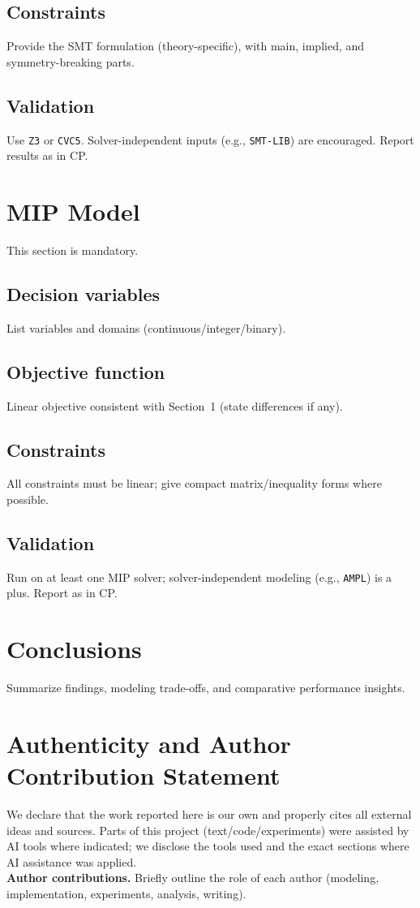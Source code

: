 \documentclass{article}
\begin{document}
\subsection{Constraints}
Provide the SMT formulation (theory-specific), with main, implied, and symmetry-breaking parts.

\subsection{Validation}
Use \texttt{Z3} or \texttt{CVC5}. Solver-independent inputs (e.g., \texttt{SMT-LIB}) are encouraged.
Report results as in CP.

\section{MIP Model}
This section is mandatory.

\subsection{Decision variables}
List variables and domains (continuous/integer/binary).

\subsection{Objective function}
Linear objective consistent with Section~1 (state differences if any).

\subsection{Constraints}
All constraints must be linear; give compact matrix/inequality forms where possible.

\subsection{Validation}
Run on at least one MIP solver; solver-independent modeling (e.g., \texttt{AMPL}) is a plus.
Report as in CP.

\section{Conclusions}
Summarize findings, modeling trade-offs, and comparative performance insights.

\section*{Authenticity and Author Contribution Statement}
We declare that the work reported here is our own and properly cites all external ideas and sources.
Parts of this project (text/code/experiments) were assisted by AI tools where indicated; we disclose the tools used and the exact sections where AI assistance was applied.
\\[0.5em]
\textbf{Author contributions.} Briefly outline the role of each author (modeling, implementation, experiments, analysis, writing).
\end{document}
